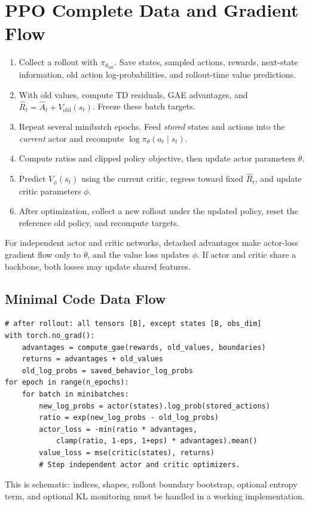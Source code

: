 \section{PPO Complete Data and Gradient Flow}
\begin{enumerate}
\item Collect a rollout with $\pi_{\theta_{\mathrm{old}}}$. Save states, sampled actions, rewards, next-state information, old action log-probabilities, and rollout-time value predictions.
\item With old values, compute TD residuals, GAE advantages, and $\hat R_t=\hat A_t+V_{\mathrm{old}}(s_t)$. Freeze these batch targets.
\item Repeat several minibatch epochs. Feed \emph{stored} states and actions into the \emph{current} actor and recompute $\log\pi_\theta(a_t\mid s_t)$.
\item Compute ratios and clipped policy objective, then update actor parameters $\theta$.
\item Predict $V_\phi(s_t)$ using the current critic, regress toward fixed $\hat R_t$, and update critic parameters $\phi$.
\item After optimization, collect a new rollout under the updated policy, reset the reference old policy, and recompute targets.
\end{enumerate}
For independent actor and critic networks, detached advantages make actor-loss gradient flow only to $\theta$, and the value loss updates $\phi$. If actor and critic share a backbone, both losses may update shared features.
\subsection{Minimal Code Data Flow}
\begin{verbatim}
# after rollout: all tensors [B], except states [B, obs_dim]
with torch.no_grad():
    advantages = compute_gae(rewards, old_values, boundaries)
    returns = advantages + old_values
    old_log_probs = saved_behavior_log_probs
for epoch in range(n_epochs):
    for batch in minibatches:
        new_log_probs = actor(states).log_prob(stored_actions)
        ratio = exp(new_log_probs - old_log_probs)
        actor_loss = -min(ratio * advantages,
            clamp(ratio, 1-eps, 1+eps) * advantages).mean()
        value_loss = mse(critic(states), returns)
        # Step independent actor and critic optimizers.
\end{verbatim}
This is schematic: indices, shapes, rollout boundary bootstrap, optional entropy term, and optional KL monitoring must be handled in a working implementation.
